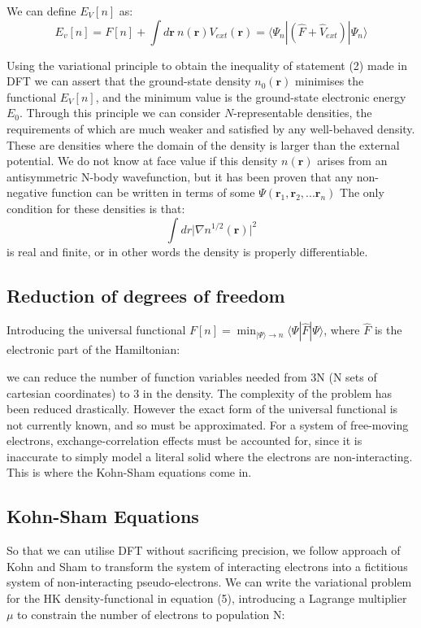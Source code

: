 \documentclass[10pt]{article}
\begin{document}
We can define $E_V[n]$ as:
\begin{equation}
	E_v[n] = F[n]+\int d\mathbf{r} \ n(\mathbf{r})V_{ext}(\mathbf{r}) = \langle\Psi_n|(\hat{F}+\hat{V}_{ext})|\Psi_n\rangle
\end{equation}

Using the variational principle to obtain the inequality of statement (2) made in DFT \cite{haynes} we can assert that the ground-state density $n_0(\mathbf{r})$ minimises the functional $E_V[n]$, and the minimum value is the ground-state electronic energy $E_0$. Through this principle we can consider $N$-representable densities, the requirements of which are much weaker and satisfied by any well-behaved density. These are densities where the domain of the density is larger than the external potential. We do not know at face value if this density $n(\mathbf{r})$ arises from an antisymmetric N-body wavefunction, but it has been proven that any non-negative function can be written in terms of some $\Psi(\mathbf{r}_1,\mathbf{r}_2,...\mathbf{r}_n)$ \cite{gilbert1975hohenberg} The only condition for these densities is that: $$\int dr \biggr|\nabla n^{1/2}(\mathbf{r})\biggr|^2$$ is real and finite, or in other words the density is properly differentiable.

\subsection{Reduction of degrees of freedom}

Introducing the universal functional $F[n] = \min_{|\Psi\rangle\rightarrow n}\langle\Psi|\hat{F}|\Psi\rangle$, where $\hat{F}$ is the electronic part of the Hamiltonian:

we can reduce the number of function variables needed from 3N (N sets of cartesian coordinates) to 3 in the density. The complexity of the problem has been reduced drastically. However the exact form of the universal functional is not currently known, and so must be approximated. For a system of free-moving electrons, exchange-correlation effects must be accounted for, since it is inaccurate to simply model a literal solid where the electrons are non-interacting. This is where the Kohn-Sham equations come in.

\subsection{Kohn-Sham Equations}

So that we can utilise DFT without sacrificing precision, we follow approach of Kohn and Sham \cite{kohn1965self} to transform the system of interacting electrons into a fictitious system of non-interacting pseudo-electrons. We can write the variational problem for the HK density-functional in equation (5), introducing a Lagrange multiplier $\mu$ to constrain the number of electrons to population N:
\end{document}

